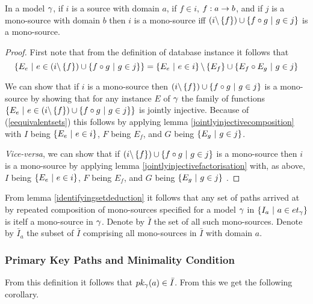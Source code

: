 \begin{lemma}
\label{identifyingsetdeduction}

In a model $\gamma$, if $i$ is a source with domain $a$,
if $f \in i$, $f: a \rightarrow b$, and if $j$ is a mono-source with domain $b$ then 
$i$ is a mono-source iff $(i \backslash \left\{f\right\}) \cup \left\{f \circ g \ \middle|\ g \in j\right\}$ is a mono-source.
\end{lemma}
\begin{proof}
First note that from the definition of database instance it follows that 
\begin{equation}
\label{eequivalentsets}
\left\{E_e \ \middle|\ e \in (i \backslash \left\{f\right\}) \cup \left\{f \circ g \ \middle|\ g \in j\right\}\right\}
= \left\{E_e \ \middle|\ e \in i\right\} \backslash \left\{E_f\right\} \cup \left\{E_f \circ E_g \ \middle|\ g \in j\right\}
\end{equation}

We can show that if $i$ is a mono-source 
then $(i \backslash \left\{f\right\}) \cup \left\{f \circ g \ \middle|\ g \in j\right\}$ is a mono-source
by showing that for any instance $E$ of $\gamma$ the family of functions 
$\left\{E_e \ \middle|\ e \in (i \backslash \left\{f\right\}) \cup \left\{f \circ g \ \middle|\ g \in j\right\}\right\}$
is jointly injective. Because of (\ref{eequivalentsets}) this follows by applying lemma \ref{jointlyinjectivecomposition} with $I$ being $\left\{E_e \ \middle|\ e \in i\right\}$,
$F$ being $E_f$,  and $G$ being $\left\{E_g \ \middle|\ g \in j\right\}$.

\textit{Vice-versa}, we can show that if $(i \backslash \left\{f\right\}) \cup \left\{f \circ g \ \middle|\ g \in j\right\}$ is a mono-source then $i$ is a mono-source by applying lemma \ref{jointlyinjectivefactorisation} 
with, as above, $I$ being $\left\{E_e \ \middle|\ e \in i\right\}$,
$F$ being $E_f$,  and $G$ being $\left\{E_g \ \middle|\ g \in j\right\}$ .
\end{proof}

From lemma \ref{identifyingsetdeduction} it follows that any set of paths arrived at by repeated composition of mono-sources specified for a model $\gamma$ in $\left\{I_a \ \middle|\ a \in et_{\gamma}\right\}$ is itelf a mono-source in $\gamma$. Denote by $\bar{I}$ the set  of all such mono-sources.
Denote by $\bar{I}_a$ the subset of $\bar{I}$ comprising all mono-sources in $\bar{I}$ with domain $a$.

\subsubsection{Primary Key Paths and Minimality Condition}
\label{minimalitycondition}
 From this definition it follows that $pk_{\gamma}(a) \in \bar{I}$. From this we get the following corollary.


